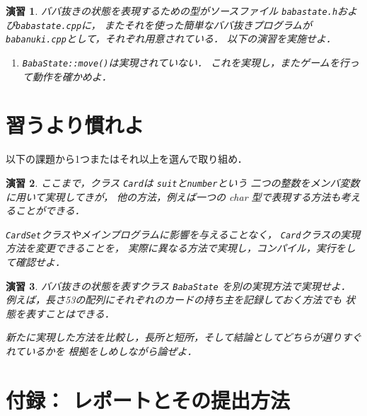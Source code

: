 \documentclass[11pt,a4,epsf]{jarticle}
\newtheorem{exerc}{演習}
\begin{document}
\begin{exerc} %
ババ抜きの状態を表現するための型がソースファイル
\verb+babastate.h+および\verb+babastate.cpp+に，
またそれを使った簡単なババ抜きプログラムが
\verb+babanuki.cpp+として，それぞれ用意されている．
以下の演習を実施せよ．

\begin{enumerate}

\item[(1)] \verb+BabaState::move()+は実現されていない．
これを実現し，またゲームを行って動作を確かめよ．

\end{enumerate}

\end{exerc} %

\section{習うより慣れよ}

以下の課題から1つまたはそれ以上を選んで取り組め．

\begin{exerc} %
ここまで，クラス \verb+Card+は \verb+suit+と\verb+number+という
二つの整数をメンバ変数に用いて実現してきが，
他の方法，例えば一つの char 型で表現する方法も考えることができる．

\verb+CardSet+クラスやメインプログラムに影響を与えることなく，
\verb+Card+クラスの実現方法を変更できることを，
実際に異なる方法で実現し，コンパイル，実行をして確認せよ．
\end{exerc} %

\begin{exerc} %
ババ抜きの状態を表すクラス \verb+BabaState+ を別の実現方法で実現せよ．
例えば，長さ53の配列にそれぞれのカードの持ち主を記録しておく方法でも
状態を表すことはできる．

新たに実現した方法を比較し，長所と短所，そして結論としてどちらが選りすぐれているかを
根拠をしめしながら論ぜよ．
\end{exerc} %

%

\newpage
\section*{付録： レポートとその提出方法}
\end{document}
